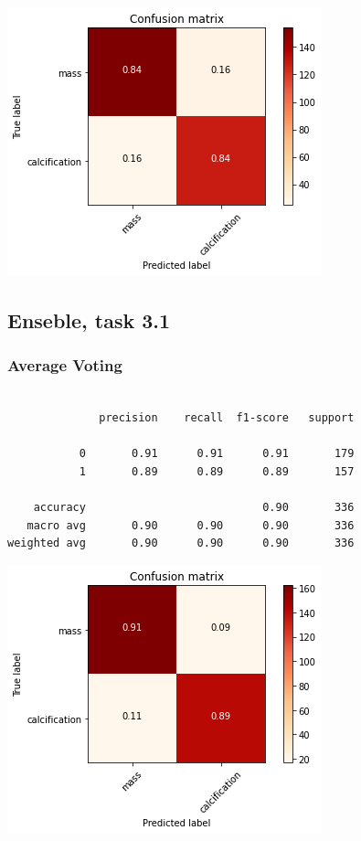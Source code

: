 \documentclass{article}
\begin{document}
\begin{center}
\begin{minipage}{0.45\textwidth}
        \includegraphics[scale=0.6]{./img/cmEnsMaj2_1.png}
    \end{minipage}
\end{center}



\subsection{Enseble, task 3.1}
\subsubsection{Average Voting}

\begin{verbatim}

              precision    recall  f1-score   support

           0       0.91      0.91      0.91       179
           1       0.89      0.89      0.89       157

    accuracy                           0.90       336
   macro avg       0.90      0.90      0.90       336
weighted avg       0.90      0.90      0.90       336

\end{verbatim}

\begin{center}
\begin{minipage}{0.45\textwidth}
        \includegraphics[scale=0.6]{./img/cmEnsAvg3_1.png}
    \end{minipage}
\end{center}
\end{document}
